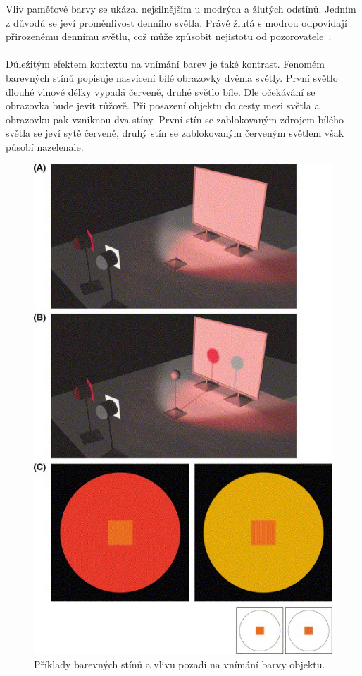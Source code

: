 Vliv paměťové barvy se ukázal nejsilnějším u modrých a žlutých odstínů. Jedním z důvodů se jeví proměnlivost denního světla. Právě žlutá s modrou
odpovídají přirozenému dennímu světlu, což může způsobit nejistotu od pozorovatele~\cite{color-perception}.
\\
\\
Důležitým efektem kontextu na vnímání barev je také kontrast. Fenomém barevných stínů popisuje nasvícení
bílé obrazovky dvěma světly. První světlo dlouhé vlnové délky vypadá červeně, druhé světlo bíle. Dle
očekávání se obrazovka bude jevit růžově. Při posazení objektu do cesty mezi světla a obrazovku pak vzniknou dva stíny. První stín se
zablokovaným zdrojem bílého světla se jeví sytě červeně, druhý stín se zablokovaným červeným světlem však působí nazelenale.

\begin{figure}[!ht]
    \centering
    \includegraphics[width=0.63\linewidth]{images/contrast.jpg}
    \caption{Příklady barevných stínů a vlivu pozadí na vnímání barvy objektu.~\cite{BEAULOTTO2002609}}
    \label{fig:Kontrasty}
\end{figure}

